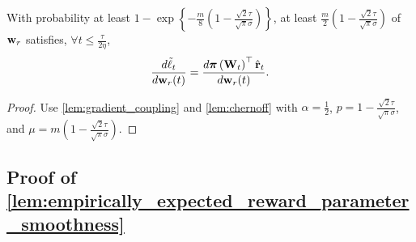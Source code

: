 \begin{lem}
\label{lem:gradient_coupling_in_total}
With probability at least $1 - \exp\left\{ - \frac{m}{8} \left( 1 - \frac{\sqrt{2}\tau}{\sqrt{\pi}\sigma} \right) \right\}$, at least $\frac{m}{2}\left( 1 - \frac{\sqrt{2}\tau}{\sqrt{\pi}\sigma} \right) $ of ${\mathbf{w}}_r$ satisfies, $\forall t \le \frac{\tau}{ 2 \eta }$,
\begin{equation*}
	\frac{d\tilde{\ell}_t}{d {\mathbf{w}}_r(t)} = \frac{d {\boldsymbol{\pi}}\left({\mathbf{W}}_t\right)^\top \hat{{\mathbf{r}}}_t}{d {\mathbf{w}}_r(t)}.
\end{equation*}
\end{lem}
\begin{proof}
Use \cref{lem:gradient_coupling} and \cref{lem:chernoff} with $\alpha = \frac{1}{2}$, $p = 1 - \frac{\sqrt{2}\tau}{\sqrt{\pi}\sigma}$, and $\mu = m \left( 1 - \frac{\sqrt{2}\tau}{\sqrt{\pi}\sigma} \right)$.
\end{proof}

\subsection{Proof of \cref{lem:empirically_expected_reward_parameter_smoothness}}

